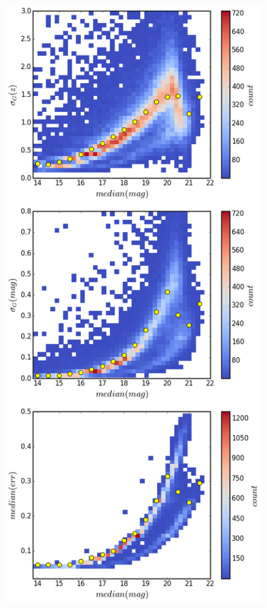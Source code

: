 \documentclass[fleqn,usenatbib]{mnras}
\begin{document}
\begin{figure}
\includegraphics[width=1.0\columnwidth, center]{Fig_A1.png}

\end{figure}
\end{document}
